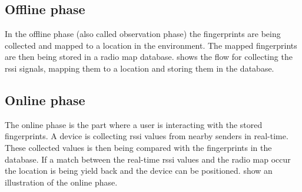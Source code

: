 \subsection{Offline phase}\label{sec:theoryFingerprintOffline}
In the offline phase (also called observation phase) the fingerprints are being collected and
mapped to a location in the environment.
The mapped fingerprints are then being stored in a radio map database.
 shows the flow for collecting the \acrshort{rssi} signals, mapping them to a location and storing them in the database.
\cite{IndoorFingerprintPositioning2017} 



\subsection{Online phase}\label{sec:theoryFingerprintOnline} The online phase
is the part where a user is interacting with the stored fingerprints.
A device is collecting \acrshort{rssi} values from nearby senders in real-time.
These collected values is then being compared with the fingerprints in the database.
If a match between the real-time \acrshort{rssi} values and the radio map occur the location is being yield back and the device can be positioned.
 show an illustration of the
online phase.
\cite{IndoorFingerprintPositioning2017}


